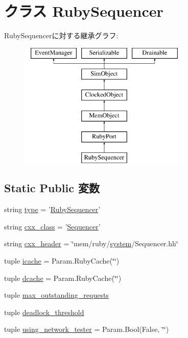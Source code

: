 \hypertarget{classSequencer_1_1RubySequencer}{
\section{クラス RubySequencer}
\label{classSequencer_1_1RubySequencer}
}
RubySequencerに対する継承グラフ:\begin{figure}[H]
\begin{center}
\leavevmode
\includegraphics[height=6cm]{classSequencer_1_1RubySequencer}
\end{center}
\end{figure}
\subsection*{Static Public 変数}
\begin{DoxyCompactItemize}
\item 
string \hyperlink{classSequencer_1_1RubySequencer_acce15679d830831b0bbe8ebc2a60b2ca}{type} = '\hyperlink{classSequencer_1_1RubySequencer}{RubySequencer}'
\item 
string \hyperlink{classSequencer_1_1RubySequencer_a58cd55cd4023648e138237cfc0822ae3}{cxx\_\-class} = '\hyperlink{classSequencer}{Sequencer}'
\item 
string \hyperlink{classSequencer_1_1RubySequencer_a17da7064bc5c518791f0c891eff05fda}{cxx\_\-header} = \char`\"{}mem/ruby/\hyperlink{classSequencer_1_1RubyPort_ab737471139f5a296e5b26e8a0e1b0744}{system}/Sequencer.hh\char`\"{}
\item 
tuple \hyperlink{classSequencer_1_1RubySequencer_a0324f1e40eeeac3fb68490e7a090f318}{icache} = Param.RubyCache(\char`\"{}\char`\"{})
\item 
tuple \hyperlink{classSequencer_1_1RubySequencer_a280088b2250121d87ebf513751fb240b}{dcache} = Param.RubyCache(\char`\"{}\char`\"{})
\item 
tuple \hyperlink{classSequencer_1_1RubySequencer_aea9a472530ae31f7705dc2511123df13}{max\_\-outstanding\_\-requests}
\item 
tuple \hyperlink{classSequencer_1_1RubySequencer_a642b24433a9b8d923a6fee4e6dce2bb0}{deadlock\_\-threshold}
\item 
tuple \hyperlink{classSequencer_1_1RubySequencer_a4712a4cfd29e8a799de69ec5010f9de3}{using\_\-network\_\-tester} = Param.Bool(False, \char`\"{}\char`\"{})
\end{DoxyCompactItemize}


